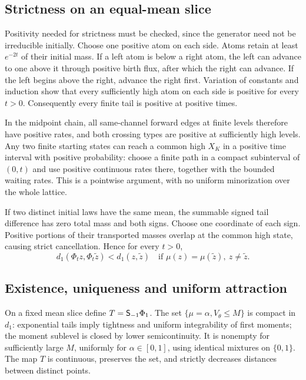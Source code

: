 \subsection{Strictness on an equal-mean slice}
Positivity needed for strictness must be checked, since the generator need not be irreducible initially. Choose one positive atom on each side. Atoms retain at least $e^{-2t}$ of their initial mass. If a left atom is below a right atom, the left can advance to one above it through positive birth flux, after which the right can advance. If the left begins above the right, advance the right first. Variation of constants and induction show that every sufficiently high atom on each side is positive for every $t>0$. Consequently every finite tail is positive at positive times.

In the midpoint chain, all same-channel forward edges at finite levels therefore have positive rates, and both crossing types are positive at sufficiently high levels. Any two finite starting states can reach a common high $X_K$ in a positive time interval with positive probability: choose a finite path in a compact subinterval of $(0,t)$ and use positive continuous rates there, together with the bounded waiting rates. This is a pointwise argument, with no uniform minorization over the whole lattice.

If two distinct initial laws have the same mean, the summable signed tail difference has zero total mass and both signs. Choose one coordinate of each sign. Positive portions of their transported masses overlap at the common high state, causing strict cancellation. Hence for every $t>0$,
\begin{equation}\label{eq:strict}
 d_1(\Phi_tz,\Phi_t\widetilde z)<d_1(z,\widetilde z)
 \quad\text{if }\mu(z)=\mu(\widetilde z),\ z\ne\widetilde z.
\end{equation}

\subsection{Existence, uniqueness and uniform attraction}
On a fixed mean slice define $T=\mathsf S_{-1}\Phi_1$. The set
$\{\mu=\alpha,V_\theta\le M\}$ is compact in $d_1$: exponential tails imply tightness and uniform integrability of first moments; the moment sublevel is closed by lower semicontinuity. It is nonempty for sufficiently large $M$, uniformly for $\alpha\in[0,1]$, using identical mixtures on $\{0,1\}$. The map $T$ is continuous, preserves the set, and strictly decreases distances between distinct points.

